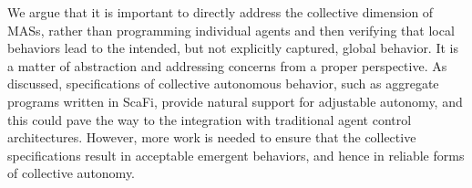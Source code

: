 \documentclass[jsan,article,accept,moreauthors,pdftex]{Definitions/mdpi}
\begin{document}
\begin{paracol}{2}
We argue that it is important 
 to {directly} address the collective dimension of MASs,
 rather than programming individual agents
 and then verifying that local behaviors lead to the intended, but not explicitly captured, global behavior.
%
It is a matter of abstraction
 and addressing concerns from a proper perspective.
%
As discussed,
 specifications of collective autonomous behavior,
 such as aggregate programs written in ScaFi,
 provide natural support for adjustable autonomy,
 and this could pave the way to the integration
 with traditional agent control architectures.
%
However, more work is needed
 to ensure that the collective specifications 
 result in acceptable emergent behaviors,
 and hence in reliable forms of collective autonomy.

 
 \vspace{6pt} 
 
 




\end{paracol}
\end{document}
